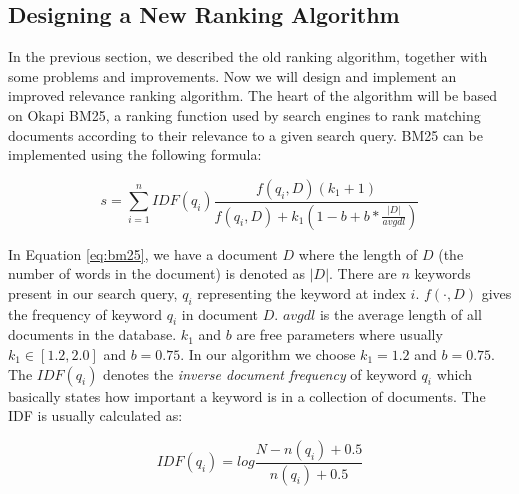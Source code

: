 \subsection{Designing a New Ranking Algorithm}
In the previous section, we described the old ranking algorithm, together with some problems and improvements. Now we will design and implement an improved relevance ranking algorithm. The heart of the algorithm will be based on Okapi BM25, a ranking function used by search engines to rank matching documents according to their relevance to a given search query\cite{jones2000probabilistic}. BM25 can be implemented using the following formula:

\begin{equation}
\label{eq:bm25}
s = \sum_{i=1}^{n} IDF(q_i) \frac{f(q_i, D)(k_1 + 1)}{f(q_i, D) + k_1 (1 - b + b * \frac{|D|}{avgdl})}
\end{equation}

\noindent In Equation \ref{eq:bm25}, we have a document $ D $ where the length of $ D $ (the number of words in the document) is denoted as $ |D| $. There are $ n $ keywords present in our search query, $ q_i $ representing the keyword at index $ i $. $ f(\cdot, D) $ gives the frequency of keyword $ q_i $ in document $ D $. $ avgdl $ is the average length of all documents in the database. $ k_1 $ and $ b $ are free parameters where usually $ k_1  \in [1.2,2.0] $ and $ b = 0.75 $. In our algorithm we choose $ k_1 = 1.2 $ and $ b = 0.75 $. The $ IDF(q_i) $ denotes the \emph{inverse document frequency} of keyword $ q_i $ which basically states how important a keyword is in a collection of documents. The IDF is usually calculated as:

\begin{equation}
\label{eq:bm25-idf}
IDF(q_i) = log\frac{N - n(q_i) + 0.5}{n(q_i) + 0.5}
\end{equation}

